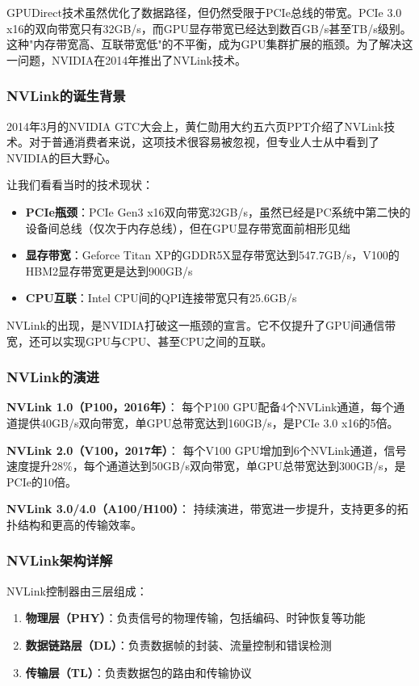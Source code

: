 GPUDirect技术虽然优化了数据路径，但仍然受限于PCIe总线的带宽。PCIe 3.0 x16的双向带宽只有32GB/s，而GPU显存带宽已经达到数百GB/s甚至TB/s级别。这种"内存带宽高、互联带宽低"的不平衡，成为GPU集群扩展的瓶颈。为了解决这一问题，NVIDIA在2014年推出了NVLink技术。

\subsubsection{NVLink的诞生背景}

2014年3月的NVIDIA GTC大会上，黄仁勋用大约五六页PPT介绍了NVLink技术。对于普通消费者来说，这项技术很容易被忽视，但专业人士从中看到了NVIDIA的巨大野心。

让我们看看当时的技术现状：
\begin{itemize}
    \item \textbf{PCIe瓶颈}：PCIe Gen3 x16双向带宽32GB/s，虽然已经是PC系统中第二快的设备间总线（仅次于内存总线），但在GPU显存带宽面前相形见绌
    \item \textbf{显存带宽}：Geforce Titan XP的GDDR5X显存带宽达到547.7GB/s，V100的HBM2显存带宽更是达到900GB/s
    \item \textbf{CPU互联}：Intel CPU间的QPI连接带宽只有25.6GB/s
\end{itemize}

NVLink的出现，是NVIDIA打破这一瓶颈的宣言。它不仅提升了GPU间通信带宽，还可以实现GPU与CPU、甚至CPU之间的互联。

\subsubsection{NVLink的演进}

\textbf{NVLink 1.0（P100，2016年）}：
每个P100 GPU配备4个NVLink通道，每个通道提供40GB/s双向带宽，单GPU总带宽达到160GB/s，是PCIe 3.0 x16的5倍。

\textbf{NVLink 2.0（V100，2017年）}：
每个V100 GPU增加到6个NVLink通道，信号速度提升28\%，每个通道达到50GB/s双向带宽，单GPU总带宽达到300GB/s，是PCIe的10倍。

\textbf{NVLink 3.0/4.0（A100/H100）}：
持续演进，带宽进一步提升，支持更多的拓扑结构和更高的传输效率。

\subsubsection{NVLink架构详解}

NVLink控制器由三层组成：
\begin{enumerate}
    \item \textbf{物理层（PHY）}：负责信号的物理传输，包括编码、时钟恢复等功能
    \item \textbf{数据链路层（DL）}：负责数据帧的封装、流量控制和错误检测
    \item \textbf{传输层（TL）}：负责数据包的路由和传输协议
\end{enumerate}


